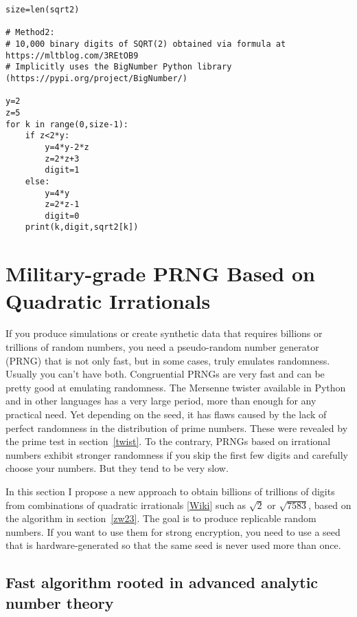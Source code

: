 \documentclass[oneside,10pt]{book}
\begin{document}
\begin{lstlisting}
size=len(sqrt2)

# Method2:
# 10,000 binary digits of SQRT(2) obtained via formula at https://mltblog.com/3REtOB9
# Implicitly uses the BigNumber Python library (https://pypi.org/project/BigNumber/)

y=2
z=5
for k in range(0,size-1): 
    if z<2*y:
        y=4*y-2*z
        z=2*z+3
        digit=1 
    else:
        y=4*y
        z=2*z-1
        digit=0 
    print(k,digit,sqrt2[k])
\end{lstlisting}


\section{Military-grade PRNG Based on Quadratic Irrationals}\label{pivizintrobvbc}

If you produce simulations or create \textcolor{index}{synthetic data} 
 that requires billions or trillions of random numbers, you 
 need a pseudo-random number generator (PRNG) that is not only fast, but in some cases, truly emulates randomness.
 Usually you can't have both. Congruential PRNGs are very fast and can be pretty good at emulating randomness.
 The Mersenne twister available in Python and in other languages has a very large period, more than enough for any
 practical need. Yet depending on the seed, it has flaws caused by the lack of perfect randomness in the distribution of prime numbers. These were revealed by the \textcolor{index}{prime test} in section~\ref{twist}. To the contrary, PRNGs based on irrational numbers exhibit
 stronger randomness if you skip the first few digits and carefully choose your numbers. But they tend to be very slow.

In this section I propose a new approach to obtain billions of trillions of digits  from combinations of 
\textcolor{index}{quadratic irrationals} [\href{https://en.wikipedia.org/wiki/Quadratic_irrational_number}{Wiki}] such as
 $\sqrt{2}$ or $\sqrt{7583}$, based on the algorithm in section~\ref{zw23}. The goal is to produce replicable random numbers. If you want to use them for strong encryption, you need to use a seed that is hardware-generated so that the same seed is never used more than once. 

\subsection{Fast algorithm rooted in advanced analytic number theory}\label{nt6hg4xz}
\end{document}
